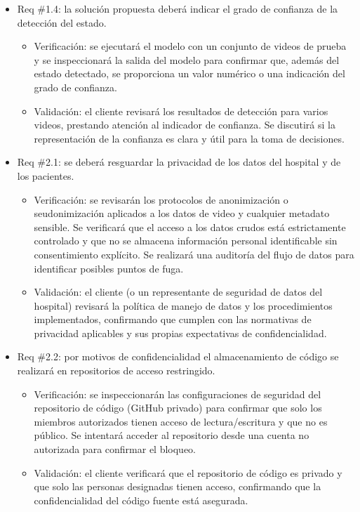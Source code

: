 \documentclass[
11pt, %
]{charter}
\begin{document}
\begin{itemize}
	\item Req \#1.4: la solución propuesta deberá indicar el grado de confianza de la detección del estado.
	\begin{itemize}
		\item Verificación: se ejecutará el modelo con un conjunto de videos de prueba y se inspeccionará la salida del modelo para confirmar que, además del estado detectado, se proporciona un valor numérico o una indicación del grado de confianza.
		\item Validación: el cliente revisará los resultados de detección para varios videos, prestando atención al indicador de confianza. Se discutirá si la representación de la confianza es clara y útil para la toma de decisiones.
	\end{itemize}
	
	\item Req \#2.1: se deberá resguardar la privacidad de los datos del hospital y de los pacientes.
	\begin{itemize}
		\item Verificación: se revisarán los protocolos de anonimización o seudonimización aplicados a los datos de video y cualquier metadato sensible. Se verificará que el acceso a los datos crudos está estrictamente controlado y que no se almacena información personal identificable sin consentimiento explícito. Se realizará una auditoría del flujo de datos para identificar posibles puntos de fuga.
		\item Validación: el cliente (o un representante de seguridad de datos del hospital) revisará la política de manejo de datos y los procedimientos implementados, confirmando que cumplen con las normativas de privacidad aplicables y sus propias expectativas de confidencialidad.
	\end{itemize}
	
	\item Req \#2.2: por motivos de confidencialidad el almacenamiento de código se realizará en repositorios de acceso restringido.
	\begin{itemize}
		\item Verificación: se inspeccionarán las configuraciones de seguridad del repositorio de código (GitHub privado) para confirmar que solo los miembros autorizados tienen acceso de lectura/escritura y que no es público. Se intentará acceder al repositorio desde una cuenta no autorizada para confirmar el bloqueo.
		\item Validación: el cliente verificará que el repositorio de código es privado y que solo las personas designadas tienen acceso, confirmando que la confidencialidad del código fuente está asegurada.
	\end{itemize}
	

\end{itemize}
\end{document}
